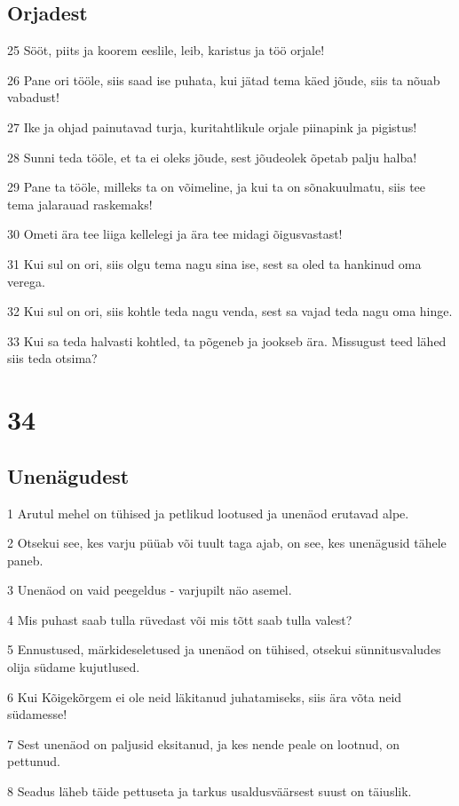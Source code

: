 \section*{Orjadest}

\par 25 Sööt, piits ja koorem eeslile, leib, karistus ja töö orjale!
\par 26 Pane ori tööle, siis saad ise puhata, kui jätad tema käed jõude, siis ta nõuab vabadust!
\par 27 Ike ja ohjad painutavad turja, kuritahtlikule orjale piinapink ja pigistus!
\par 28 Sunni teda tööle, et ta ei oleks jõude, sest jõudeolek õpetab palju halba!
\par 29 Pane ta tööle, milleks ta on võimeline, ja kui ta on sõnakuulmatu, siis tee tema jalarauad raskemaks!
\par 30 Ometi ära tee liiga kellelegi ja ära tee midagi õigusvastast!
\par 31 Kui sul on ori, siis olgu tema nagu sina ise, sest sa oled ta hankinud oma verega.
\par 32 Kui sul on ori, siis kohtle teda nagu venda, sest sa vajad teda nagu oma hinge.
\par 33 Kui sa teda halvasti kohtled, ta põgeneb ja jookseb ära. Missugust teed lähed siis teda otsima?

\chapter{34}

\section*{Unenägudest}

\par 1 Arutul mehel on tühised ja petlikud lootused ja unenäod erutavad alpe.
\par 2 Otsekui see, kes varju püüab või tuult taga ajab, on see, kes unenägusid tähele paneb.
\par 3 Unenäod on vaid peegeldus - varjupilt näo asemel.
\par 4 Mis puhast saab tulla rüvedast või mis tõtt saab tulla valest?
\par 5 Ennustused, märkideseletused ja unenäod on tühised, otsekui sünnitusvaludes olija südame kujutlused.
\par 6 Kui Kõigekõrgem ei ole neid läkitanud juhatamiseks, siis ära võta neid südamesse!
\par 7 Sest unenäod on paljusid eksitanud, ja kes nende peale on lootnud, on pettunud.
\par 8 Seadus läheb täide pettuseta ja tarkus usaldusväärsest suust on täiuslik.

